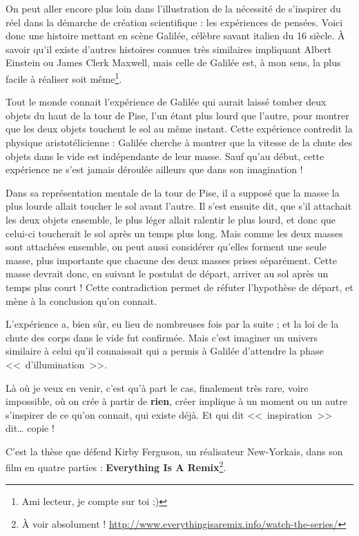 On peut aller encore plus loin dans l'illustration de la nécessité de s'inspirer du réel dans la démarche de création scientifique : les expériences de pensées.
Voici donc une histoire mettant en scène Galilée, célèbre savant italien du 16\ieme{} siècle.
À savoir qu'il existe d'autres histoires connues très similaires impliquant Albert Einstein ou James Clerk Maxwell, mais celle de Galilée est, à mon sens, la plus facile à réaliser soit même\footnote{Ami lecteur, je compte sur toi ;)}.

Tout le monde connait l'expérience de Galilée qui aurait laissé tomber deux objets du haut de la tour de Pise, l'un étant plus lourd que l'autre, pour montrer que les deux objets touchent le sol au même instant.
Cette expérience contredit la physique aristotélicienne : Galilée cherche à montrer que la vitesse de la chute des objets dans le vide est indépendante de leur masse.
Sauf qu'au début, cette expérience ne s'est jamais déroulée ailleurs que dans son imagination !

Dans sa représentation mentale de la tour de Pise, il a supposé que la masse la plus lourde allait toucher le sol avant l'autre.
Il s'est ensuite dit, que s'il attachait les deux objets ensemble, le plus léger allait ralentir le plus lourd, et donc que celui-ci toucherait le sol après un temps plus long.
Mais comme les deux masses sont attachées ensemble, on peut aussi considérer qu'elles forment une seule masse, plus importante que chacune des deux masses prises séparément.
Cette masse devrait donc, en suivant le postulat de départ, arriver au sol après un temps plus court !
Cette contradiction permet de réfuter l'hypothèse de départ, et mène à la conclusion qu'on connait.

L'expérience a, bien sûr, eu lieu de nombreuses fois par la suite ; et la loi de la chute des corps dans le vide fut confirmée.
Mais c'est imaginer un univers similaire à celui qu'il connaissait qui a permis à Galilée d'attendre la phase <<~d'illumination~>>.

Là où je veux en venir, c'est qu'à part le cas, finalement très rare, voire impossible, où on crée à partir de \textbf{rien}, créer implique à un moment ou un autre s'inspirer de ce qu'on connait, qui existe déjà.
Et qui dit <<~inspiration~>> dit\dots{} copie !

C'est la thèse que défend Kirby Ferguson, un réalisateur New-Yorkais, dans son film en quatre parties : \textbf{Everything Is A Remix}\footnote{À voir absolument ! \url{http://www.everythingisaremix.info/watch-the-series/}}.

